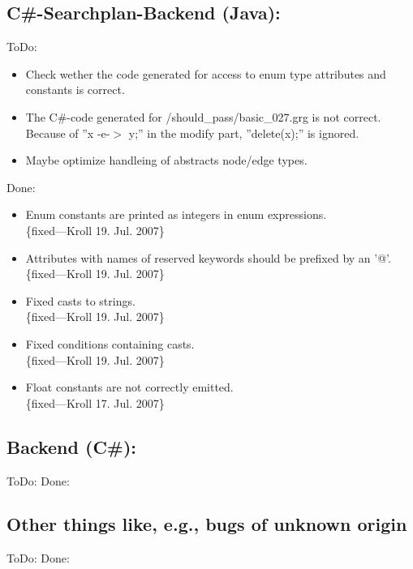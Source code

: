 \documentclass[12pt,a4paper]{article}
\begin{document}
\subsection*{C\#-Searchplan-Backend (Java):}
ToDo:
\begin{itemize}
	\item Check wether the code generated for access to enum type attributes and constants is correct.
	\item The C\#-code generated for {/should\_pass/basic\_027.grg} is not correct. Because of ''x -e-$>$ y;'' in the modify part, ''delete(x);'' is ignored.
	\item Maybe optimize handleing of abstracts node/edge types.
\end{itemize}
Done:
\begin{itemize}
    \item Enum constants are printed as integers in enum expressions.\\
    \{fixed---Kroll 19. Jul. 2007\}
    \item Attributes with names of reserved keywords should be prefixed by an '@'.\\
    \{fixed---Kroll 19. Jul. 2007\}
    \item Fixed casts to strings.\\
    \{fixed---Kroll 19. Jul. 2007\}
    \item Fixed conditions containing casts.\\
    \{fixed---Kroll 19. Jul. 2007\}
    \item Float constants are not correctly emitted.\\
    \{fixed---Kroll 17. Jul. 2007\}
\end{itemize}


\subsection*{Backend (C\#):}
ToDo:
Done:



\subsection*{Other things like, e.g., bugs of unknown origin}
ToDo:
Done:
\end{document}
